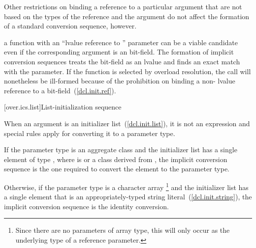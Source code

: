 \pnum
Other restrictions on binding a reference to a particular argument
that are not based on the types of the reference and the argument
do not affect the formation of a standard conversion
sequence, however.
\begin{example}
a function with an ``lvalue reference to '' parameter can
be a viable candidate even if the corresponding argument is an
bit-field.
The formation of implicit conversion sequences
treats the
bit-field as an
lvalue and finds an exact
match with the parameter.
If the function is selected by overload
resolution, the call will nonetheless be ill-formed because of
the prohibition on binding a non- lvalue reference to a bit-field~(\ref{dcl.init.ref}).
\end{example}

[over.ics.list]{List-initialization sequence}

\pnum
When an argument is an initializer list~(\ref{dcl.init.list}), it is not an
expression and special rules apply for converting it to a parameter type.

\pnum
If the parameter type is an aggregate class  and the initializer list has a
single element of type \cv{} , where  is 
or a class derived from , the implicit conversion sequence is the one
required to convert the element to the parameter type.

\pnum
Otherwise, if the parameter type is a character array%
\footnote{Since there are no parameters of array type,
this will only occur as the underlying type of a reference parameter.}
and the initializer list has a single element that is an appropriately-typed
string literal~(\ref{dcl.init.string}), the implicit conversion
sequence is the identity conversion.

